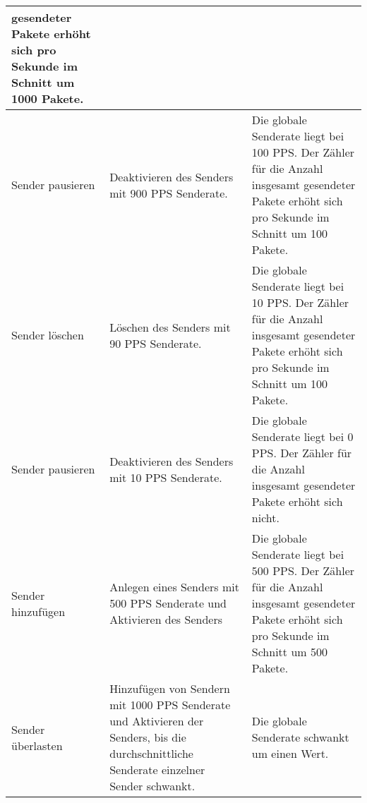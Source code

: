 \begin{table}[h]
\begin{center}
\begin{tabular}{|p{2.5cm}|p{5cm}|p{7.55cm}|}
                    gesendeter Pakete erhöht sich pro Sekunde im Schnitt um 1000
                    Pakete.\\
                \hline
                    Sender pausieren & Deaktivieren des Senders mit 900 PPS
                    Senderate. & Die globale Senderate liegt bei 100 PPS. Der
                    Zähler für die Anzahl insgesamt gesendeter Pakete erhöht
                    sich pro Sekunde im Schnitt um 100 Pakete.\\
                \hline
                    Sender löschen & Löschen des Senders mit 90 PPS Senderate. &
                    Die globale Senderate liegt bei 10 PPS. Der Zähler für die
                    Anzahl insgesamt gesendeter Pakete erhöht sich pro Sekunde
                    im Schnitt um 100 Pakete.\\
                \hline
                    Sender pausieren & Deaktivieren des Senders mit 10 PPS
                    Senderate. & Die globale Senderate liegt bei 0 PPS. Der
                    Zähler für die Anzahl insgesamt gesendeter Pakete erhöht
                    sich nicht.\\
                \hline
                    Sender hinzufügen & Anlegen eines Senders mit 500 PPS
                    Senderate und Aktivieren des Senders & Die globale Senderate
                    liegt bei 500 PPS. Der Zähler für die Anzahl insgesamt
                    gesendeter Pakete erhöht sich pro Sekunde im Schnitt um 500
                    Pakete.\\
                \hline
                    Sender überlasten & Hinzufügen von Sendern mit 1000 PPS
                    Senderate und Aktivieren der Senders, bis die
                    durchschnittliche Senderate einzelner Sender schwankt. & Die
                    globale Senderate schwankt um einen Wert.\\
                \hline
            \end{tabular}
        \end{center}
    \end{table}
    
